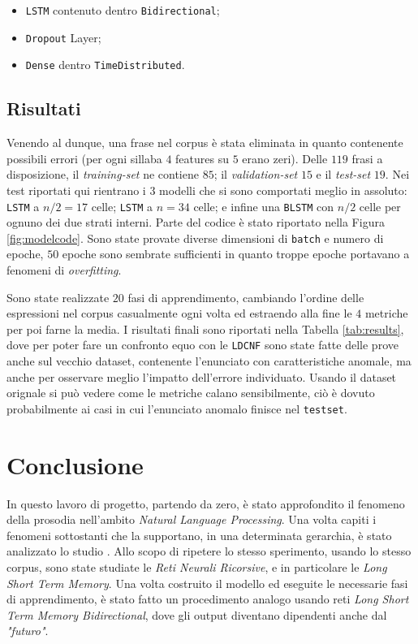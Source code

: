 \documentclass[twoside,twocolumn,10pt]{extarticle}
\theoremstyle{definition}
\begin{document}
		\begin{itemize}
			\item \texttt{LSTM} contenuto dentro \texttt{Bidirectional};
			\item \texttt{Dropout} Layer;
			\item \texttt{Dense} dentro \texttt{TimeDistributed}.
		\end{itemize}
	
	\subsection{Risultati}
		Venendo al dunque, una frase nel corpus è stata eliminata in quanto contenente possibili errori (per ogni sillaba $4$ features su $5$ erano zeri). Delle $119$ frasi a disposizione, il \textit{training-set} ne contiene $85$; il \textit{validation-set} $15$ e il \textit{test-set} $19$. Nei test riportati qui rientrano i $3$ modelli che si sono comportati meglio in assoluto: \texttt{LSTM} a $n/2 = 17$ celle; \texttt{LSTM} a $n = 34$ celle; e infine una \texttt{BLSTM} con $n/2$ celle per ognuno dei due strati interni. Parte del codice è stato riportato nella Figura \ref{fig:modelcode}. Sono state provate diverse dimensioni di \texttt{batch} e numero di epoche, $50$ epoche sono sembrate sufficienti in quanto troppe epoche portavano a fenomeni di \textit{overfitting}.
		
		Sono state realizzate $20$ fasi di apprendimento, cambiando l'ordine delle espressioni nel corpus casualmente ogni volta ed estraendo alla fine le $4$ metriche per poi farne la media. I risultati finali sono riportati nella Tabella \ref{tab:results}, dove per poter fare un confronto equo con le \texttt{LDCNF} sono state fatte delle prove anche sul vecchio dataset, contenente l'enunciato con caratteristiche anomale, ma anche per osservare meglio l'impatto dell'errore individuato. Usando il dataset orignale si può vedere come le metriche calano sensibilmente, ciò è dovuto probabilmente ai casi in cui l'enunciato anomalo finisce nel \texttt{testset}.
	
\section{Conclusione}
	In questo lavoro di progetto, partendo da zero, è stato approfondito il fenomeno della prosodia nell'ambito \textit{Natural Language Processing}. Una volta capiti i fenomeni sottostanti che la supportano, in una determinata gerarchia, è stato analizzato lo studio \cite{bib:prominence-detection-italian}. Allo scopo di ripetere lo stesso sperimento, usando lo stesso corpus, sono state studiate le \textit{Reti Neurali Ricorsive}, e in particolare le \textit{Long Short Term Memory}. Una volta costruito il modello ed eseguite le necessarie fasi di apprendimento, è stato fatto un procedimento analogo usando reti \textit{Long Short Term Memory Bidirectional}, dove gli output diventano dipendenti anche dal \textit{"futuro"}.
	
\end{document}

